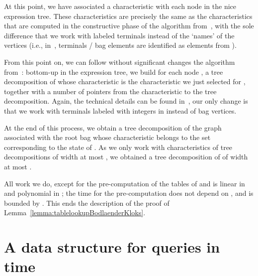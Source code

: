 \documentclass[a4paper,11pt]{article}
\theoremstyle{definition}
\theoremstyle{remark}
\begin{document}
At this point, we have associated a characteristic with each node in
the nice expression tree.  These characteristics are precisely the
same as the characteristics that are computed in the constructive
phase of the algorithm from~\cite[Section 6]{BodlaenderK96}, with the
sole difference that we work with labeled terminals instead of the
`names' of the vertices (i.e., in~\cite{BodlaenderK96}, terminals /
bag elements are identified as elements from ).

From this point on, we can follow without significant changes the
algorithm from~\cite[Section 6]{BodlaenderK96}: bottom-up in the
expression tree, we build for each node , a tree decomposition of
 whose characteristic is the characteristic we just selected for
, together with a number of pointers from the characteristic to the
tree decomposition.  Again, the technical details can be found
in~\cite{BodlaenderK96}, our only change is that we work with
terminals labeled with integers in  instead of
bag vertices.

At the end of this process, we obtain a tree decomposition of the
graph associated with the root bag  whose characteristic
belongs to the set corresponding to the state of .  As we only work
with characteristics of tree decompositions of width at most , we
obtained a tree decomposition of  of width at most .

All work we do, except for the pre-computation of the tables of 
and  is linear in  and polynomial in ; the time for the
pre-computation does not depend on , and is bounded by .  This ends the description of the proof of
Lemma~\ref{lemma:tablelookupBodlaenderKloks}.

\section{A data structure for queries in  time}
\label{section:datastructure}
\end{document}
